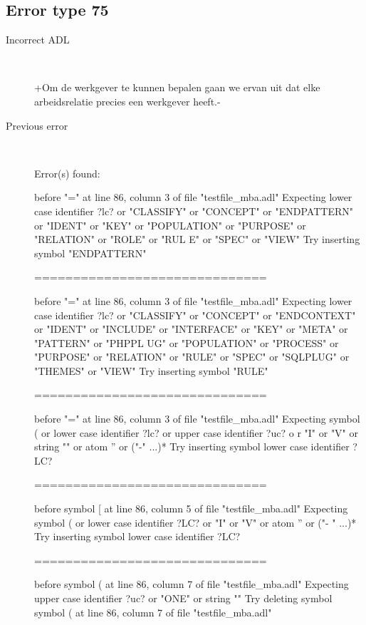 \hrulefill

\subsection{Error type 75}
  \begin{description}
  \item[Incorrect ADL]~\\
\begin{adl}
{+Om de werkgever te kunnen bepalen gaan we ervan uit dat elke arbeidsrelatie precies een werkgever heeft.-}\end{adl}
  \item[Previous error]~\\
\begin{haskell}
Error(s) found:

before "=" at line 86, column 3 of file "testfile_mba.adl"
Expecting lower case identifier ?lc? or "CLASSIFY" or "CONCEPT" or "ENDPATTERN"
or "IDENT" or "KEY" or "POPULATION" or "PURPOSE" or "RELATION" or "ROLE" or "RUL
E" or "SPEC" or "VIEW"
Try inserting symbol "ENDPATTERN"

==============================

before "=" at line 86, column 3 of file "testfile_mba.adl"
Expecting lower case identifier ?lc? or "CLASSIFY" or "CONCEPT" or "ENDCONTEXT"
or "IDENT" or "INCLUDE" or "INTERFACE" or "KEY" or "META" or "PATTERN" or "PHPPL
UG" or "POPULATION" or "PROCESS" or "PURPOSE" or "RELATION" or "RULE" or "SPEC"
or "SQLPLUG" or "THEMES" or "VIEW"
Try inserting symbol "RULE"

==============================

before "=" at line 86, column 3 of file "testfile_mba.adl"
Expecting symbol ( or lower case identifier ?lc? or upper case identifier ?uc? o
r "I" or "V" or string "" or atom '' or ("-" ...)*
Try inserting symbol lower case identifier ?LC?

==============================

before symbol [ at line 86, column 5 of file "testfile_mba.adl"
Expecting symbol ( or lower case identifier ?LC? or "I" or "V" or atom '' or ("-
" ...)*
Try inserting symbol lower case identifier ?LC?

==============================

before symbol ( at line 86, column 7 of file "testfile_mba.adl"
Expecting upper case identifier ?uc? or "ONE" or string ""
Try deleting symbol symbol ( at line 86, column 7 of file "testfile_mba.adl"


\end{haskell}
\end{description}
